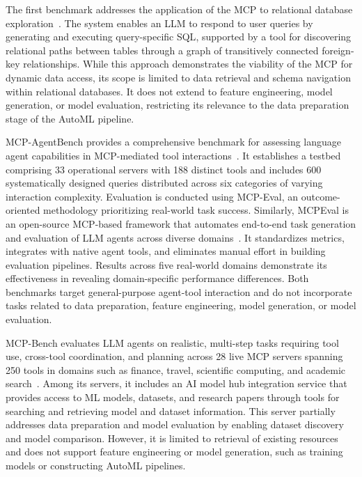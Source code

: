 \documentclass[
english,                 %
bibtex,                  %
includeExtraAbstracts, %
]{kththesis}
\numberwithin{listing}{chapter}
\begin{document}
The first benchmark addresses the application of the \gls{MCP} to relational database exploration~\cite{bramer_toolbelt-mcp_2026}. The system enables an \gls{LLM} to respond to user queries by generating and executing query-specific \gls{SQL}, supported by a tool for discovering relational paths between tables through a graph of transitively connected foreign-key relationships. While this approach demonstrates the viability of the \gls{MCP} for dynamic data access, its scope is limited to data retrieval and schema navigation within relational databases. It does not extend to feature engineering, model generation, or model evaluation, restricting its relevance to the data preparation stage of the \gls{AutoML} pipeline.

\gls{MCP}-AgentBench provides a comprehensive benchmark for assessing language agent capabilities in \gls{MCP}-mediated tool interactions~\cite{guo_mcp-agentbench_2026}. It establishes a testbed comprising 33 operational servers with 188 distinct tools and includes 600 systematically designed queries distributed across six categories of varying interaction complexity. Evaluation is conducted using \gls{MCP}-Eval, an outcome-oriented methodology prioritizing real-world task success. Similarly, \gls{MCP}Eval is an open-source \gls{MCP}-based framework that automates end-to-end task generation and evaluation of \gls{LLM} agents across diverse domains~\cite{liu_mcpeval_2025}. It standardizes metrics, integrates with native agent tools, and eliminates manual effort in building evaluation pipelines. Results across five real-world domains demonstrate its effectiveness in revealing domain-specific performance differences. Both benchmarks target general-purpose agent-tool interaction and do not incorporate tasks related to data preparation, feature engineering, model generation, or model evaluation.

\gls{MCP}-Bench evaluates \gls{LLM} agents on realistic, multi-step tasks requiring tool use, cross-tool coordination, and planning across 28 live \gls{MCP} servers spanning 250 tools in domains such as finance, travel, scientific computing, and academic search~\cite{wang_mcp-bench_2026}. Among its servers, it includes an \gls{AI} model hub integration service that provides access to \gls{ML} models, datasets, and research papers through tools for searching and retrieving model and dataset information. This server partially addresses data preparation and model evaluation by enabling dataset discovery and model comparison. However, it is limited to retrieval of existing resources and does not support feature engineering or model generation, such as training models or constructing \gls{AutoML} pipelines.
\end{document}
